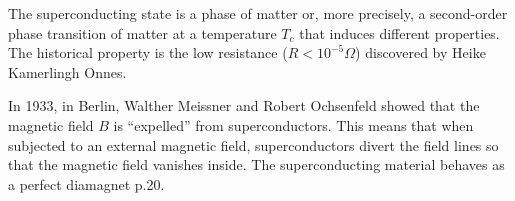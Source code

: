 
The superconducting state is a phase of matter or, more precisely, 
a second-order phase transition of matter at a temperature $T_c$ that 
induces different properties. The historical property is the low resistance 
($R < 10^{-5} \Omega$) discovered by Heike Kamerlingh Onnes.



\newpage
In 1933, in Berlin, 
Walther Meissner and Robert 
Ochsenfeld showed that the magnetic 
field $B$ is “expelled” from superconductors. 
This means that when subjected to an external magnetic 
field, superconductors divert the field lines so that the 
magnetic field vanishes inside. The superconducting material 
behaves as a perfect diamagnet \cite{mangin_superconductivity_2017} p.20.




